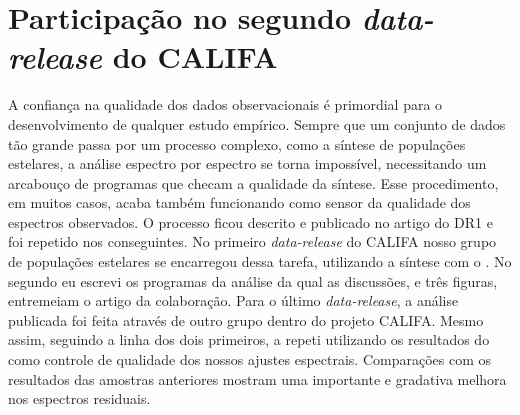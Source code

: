 

\chapter{Participação no segundo {\em data-release} do CALIFA}
\label{apendice:DR2}

A confiança na qualidade dos dados observacionais é primordial para o desenvolvimento de qualquer estudo empírico. Sempre que um conjunto de dados tão grande passa por um processo complexo, como a síntese de populações estelares, a análise espectro por espectro se torna impossível, necessitando um arcabouço de programas que checam a qualidade da síntese. Esse procedimento, em muitos casos, acaba também funcionando como sensor da qualidade dos espectros observados. O processo ficou descrito e publicado no artigo do DR1 e foi repetido nos conseguintes. No primeiro {\em data-release} do CALIFA nosso grupo de populações estelares se encarregou dessa tarefa, utilizando a síntese com o \starlight. No segundo eu escrevi os programas da análise da qual as discussões, e três figuras, entremeiam o artigo da colaboração\citep{GarciaBenito.etal.2015a}. Para o último {\em data-release}, a análise publicada foi feita através de outro grupo dentro do projeto CALIFA. Mesmo assim, seguindo a linha dos dois primeiros, a repeti utilizando os resultados do \starlight como controle de qualidade dos nossos ajustes espectrais. Comparações com os resultados das amostras anteriores mostram uma importante e gradativa melhora nos espectros residuais.

